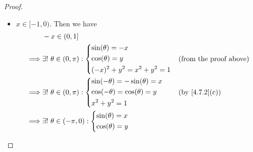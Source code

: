 \begin{proof}
\begin{itemize}
\begin{align*}
             & \big(x \in (0, 1]\big) \land \big(y \in (-1, 0]\big) \implies \exists\ \theta_2 \in [\dfrac{\pi}{2}, \pi) : \big(\sin(\theta_2) = x\big) \land \big(\cos(\theta_2) = y\big).
          \end{align*}
          But \(\cos\) is strictly decreasing on \((0, \pi)\) implies the choices of \(\theta_1\) and \(\theta_2\) are unique.
          And we conclude that
          \[
            \forall x \in (0, 1], \exists!\ \theta \in (0, \pi) : \begin{dcases}
              \sin(\theta) = x \\
              \cos(\theta) = y \\
              x^2 + y^2 = 1
            \end{dcases}
          \]
    \item \(x \in [-1, 0)\).
          Then we have
          \begin{align*}
                     & -x \in (0, 1]                                                                    \\
            \implies & \exists!\ \theta \in (0, \pi) : \begin{dcases}
                                                         \sin(\theta) = -x \\
                                                         \cos(\theta) = y  \\
                                                         (-x)^2 + y^2 = x^2 + y^2 = 1
                                                       \end{dcases}  &  & \text{(from the proof above)} \\
            \implies & \exists!\ \theta \in (0, \pi) : \begin{dcases}
                                                         \sin(-\theta) = -\sin(\theta) = x \\
                                                         \cos(-\theta) = \cos(\theta) = y  \\
                                                         x^2 + y^2 = 1
                                                       \end{dcases}  &  & \text{(by \cref{4.7.2}(c))}   \\
            \implies & \exists!\ \theta \in (-\pi, 0) : \begin{dcases}
                                                          \sin(\theta) = x \\
                                                          \cos(\theta) = y \\

\end{dcases}
\end{align*}
\end{itemize}
\end{proof}
